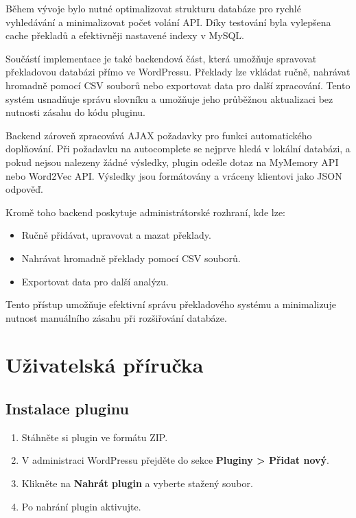 \documentclass[czech, ba, kiv, he]{fasthesis}
\begin{document}
Během vývoje bylo nutné optimalizovat strukturu databáze pro rychlé vyhledávání a minimalizovat počet volání API. Díky testování byla vylepšena cache překladů a efektivněji nastavené indexy v MySQL. 

Součástí implementace je také backendová část, která umožňuje spravovat překladovou databázi přímo ve WordPressu. Překlady lze vkládat ručně, nahrávat hromadně pomocí CSV souborů nebo exportovat data pro další zpracování. Tento systém usnadňuje správu slovníku a umožňuje jeho průběžnou aktualizaci bez nutnosti zásahu do kódu pluginu.

Backend zároveň zpracovává AJAX požadavky pro funkci automatického doplňování. Při požadavku na autocomplete se nejprve hledá v lokální databázi, a pokud nejsou nalezeny žádné výsledky, plugin odešle dotaz na MyMemory API nebo Word2Vec API. Výsledky jsou formátovány a vráceny klientovi jako JSON odpověď.

Kromě toho backend poskytuje administrátorské rozhraní, kde lze:
\begin{itemize}
    \item Ručně přidávat, upravovat a mazat překlady.
    \item Nahrávat hromadně překlady pomocí CSV souborů.
    \item Exportovat data pro další analýzu.
\end{itemize}

Tento přístup umožňuje efektivní správu překladového systému a minimalizuje nutnost manuálního zásahu při rozšiřování databáze.

\section{Uživatelská příručka}

\subsection{Instalace pluginu}
\begin{enumerate}
    \item Stáhněte si plugin ve formátu ZIP.
    \item V administraci WordPressu přejděte do sekce \textbf{Pluginy > Přidat nový}.
    \item Klikněte na \textbf{Nahrát plugin} a vyberte stažený soubor.
    \item Po nahrání plugin aktivujte.
\end{enumerate}
\end{document}
